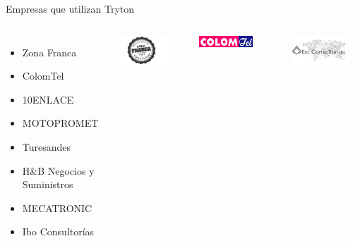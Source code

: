 	\begin{frame}{Empresas que utilizan Tryton}
	\fontsize{10}{11}\selectfont
        \begin{columns}
			\begin{itemize}
				\item Zona Franca
				\item ColomTel
				\item 10ENLACE
				\item MOTOPROMET
				\item Turesandes
				\item H\&B Negocios y Suministros
				\item MECATRONIC
				\item Ibo Consultorías
			\end{itemize}
            \vspace*{-0.6cm}
            \begin{center}
            \includegraphics[width=0.8\textwidth]{./Images/ZonaFranca.jpg}
            \end{center}
            \vspace*{-0.5cm}
            \begin{center}
            \includegraphics[width=0.7\textwidth]{./Images/ColomTel.png}
            \end{center}
            \vspace*{-0.5cm}
            \begin{center}
            \includegraphics[width=0.8\textwidth]{./Images/IboConsultorias.png}
            \end{center}

        \end{columns}    
	\end{frame}

